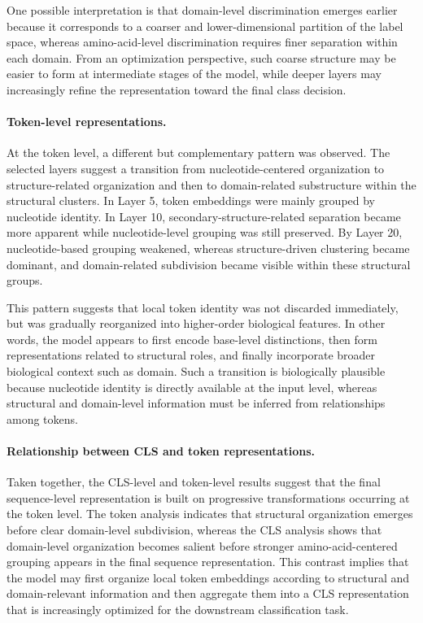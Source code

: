 \documentclass[a4paper,11pt,draft]{jsarticle}
\begin{document}
One possible interpretation is that domain-level discrimination emerges earlier because it corresponds to a coarser and lower-dimensional partition of the label space, whereas amino-acid-level discrimination requires finer separation within each domain. From an optimization perspective, such coarse structure may be easier to form at intermediate stages of the model, while deeper layers may increasingly refine the representation toward the final class decision. 

\paragraph{Token-level representations.}
At the token level, a different but complementary pattern was observed. The selected layers suggest a transition from nucleotide-centered organization to structure-related organization and then to domain-related substructure within the structural clusters. In Layer 5, token embeddings were mainly grouped by nucleotide identity. In Layer 10, secondary-structure-related separation became more apparent while nucleotide-level grouping was still preserved. By Layer 20, nucleotide-based grouping weakened, whereas structure-driven clustering became dominant, and domain-related subdivision became visible within these structural groups. 

This pattern suggests that local token identity was not discarded immediately, but was gradually reorganized into higher-order biological features. In other words, the model appears to first encode base-level distinctions, then form representations related to structural roles, and finally incorporate broader biological context such as domain. Such a transition is biologically plausible because nucleotide identity is directly available at the input level, whereas structural and domain-level information must be inferred from relationships among tokens. 

\paragraph{Relationship between CLS and token representations.}
Taken together, the CLS-level and token-level results suggest that the final sequence-level representation is built on progressive transformations occurring at the token level. The token analysis indicates that structural organization emerges before clear domain-level subdivision, whereas the CLS analysis shows that domain-level organization becomes salient before stronger amino-acid-centered grouping appears in the final sequence representation. This contrast implies that the model may first organize local token embeddings according to structural and domain-relevant information and then aggregate them into a CLS representation that is increasingly optimized for the downstream classification task. 
\end{document}
